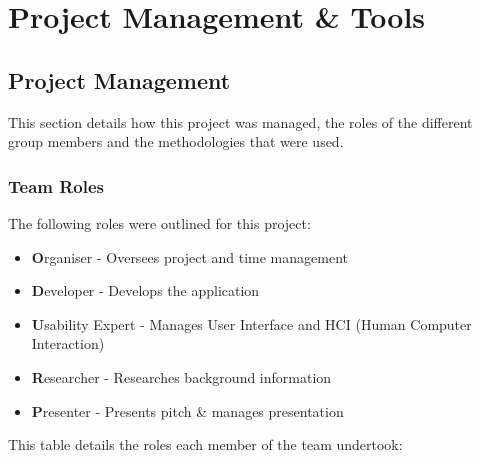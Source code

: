 \section{Project Management \& Tools}

\subsection{Project Management}
This section details how this project was managed, the roles of the different group members and the methodologies that were used.

\subsubsection{Team Roles}
The following roles were outlined for this project:

\begin{itemize}
	\item{\textbf{O}rganiser - Oversees project and time management}
	\item{\textbf{D}eveloper - Develops the application}
	\item{\textbf{U}sability Expert - Manages User Interface and HCI (Human Computer Interaction)}
	\item{\textbf{R}esearcher - Researches background information}
	\item{\textbf{P}resenter - Presents pitch \& manages presentation}
\end{itemize}

This table details the roles each member of the team undertook:

